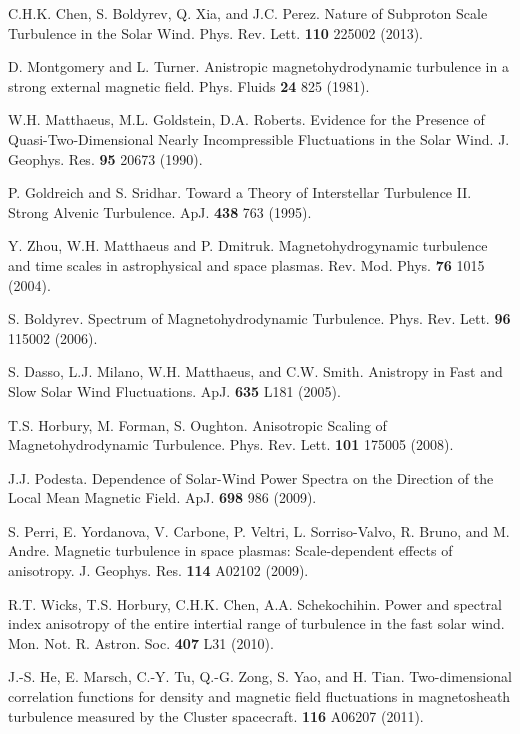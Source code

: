 \documentclass[aip,prl,amsmath,amssymb,reprint,superscriptaddress]{revtex4-1} %
\begin{document}
\begin{thebibliography}{99}
 C.H.K. Chen, S. Boldyrev, Q. Xia, and J.C. Perez. Nature of Subproton Scale Turbulence in the Solar Wind. Phys. Rev. Lett. {\bf 110} 225002 (2013).

 D. Montgomery and L. Turner. Anistropic magnetohydrodynamic turbulence in a strong external magnetic field. Phys. Fluids {\bf 24} 825 (1981).

 W.H. Matthaeus, M.L. Goldstein, D.A. Roberts. Evidence for the Presence of Quasi-Two-Dimensional Nearly Incompressible Fluctuations in the Solar Wind. J. Geophys. Res. {\bf 95} 20673 (1990).

 P. Goldreich and S. Sridhar. Toward a Theory of Interstellar Turbulence II. Strong Alvenic Turbulence. ApJ. {\bf 438} 763 (1995).

 Y. Zhou, W.H. Matthaeus and P. Dmitruk. Magnetohydrogynamic turbulence and time scales in astrophysical and space plasmas. Rev. Mod. Phys. {\bf 76} 1015 (2004).

 S. Boldyrev. Spectrum of Magnetohydrodynamic Turbulence. Phys. Rev. Lett. {\bf 96} 115002 (2006).

 S. Dasso, L.J. Milano, W.H. Matthaeus, and C.W. Smith. Anistropy in Fast and Slow Solar Wind Fluctuations. ApJ. {\bf 635} L181 (2005).

 T.S. Horbury, M. Forman, S. Oughton. Anisotropic Scaling of Magnetohydrodynamic Turbulence. Phys. Rev. Lett. {\bf 101} 175005 (2008).

 J.J. Podesta. Dependence of Solar-Wind Power Spectra on the Direction of the Local Mean Magnetic Field. ApJ. {\bf 698} 986 (2009).

 S. Perri, E. Yordanova, V. Carbone, P. Veltri, L. Sorriso-Valvo, R. Bruno, and M. Andre. Magnetic turbulence in space plasmas: Scale-dependent effects of anisotropy. J. Geophys. Res. {\bf 114} A02102 (2009).

 R.T. Wicks, T.S. Horbury, C.H.K. Chen, A.A. Schekochihin. Power and spectral index anisotropy of the entire intertial range of turbulence in the fast solar wind. Mon. Not. R. Astron. Soc. {\bf 407} L31 (2010).

 J.-S. He, E. Marsch, C.-Y. Tu, Q.-G. Zong, S. Yao, and H. Tian. Two-dimensional correlation functions for density and magnetic field fluctuations in magnetosheath turbulence measured by the Cluster spacecraft. {\bf 116} A06207 (2011).


\end{thebibliography}
\end{document}
